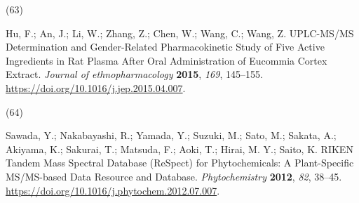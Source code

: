 \documentclass[
]{article}
\newlength{\cslhangindent}
\newlength{\csllabelwidth}
\newlength{\cslentryspacingunit} %
\newenvironment{CSLReferences}[2] %
 {%
  \setlength{\parindent}{0pt}
  \ifodd #1
  \let\oldpar\par
  \def\par{\hangindent=\cslhangindent\oldpar}
  \fi
  \setlength{\parskip}{#2\cslentryspacingunit}
 }%
 {}
\newcommand{\CSLLeftMargin}[1]{\parbox[t]{\csllabelwidth}{#1}}
\newcommand{\CSLRightInline}[1]{\parbox[t]{\linewidth - \csllabelwidth}{#1}\break}
\begin{document}
\begin{CSLReferences}{0}{0}
\leavevmode{}%
\CSLLeftMargin{(63) }%
\CSLRightInline{Hu, F.; An, J.; Li, W.; Zhang, Z.; Chen, W.; Wang, C.;
Wang, Z. {UPLC-MS}/{MS} Determination and Gender-Related Pharmacokinetic
Study of Five Active Ingredients in Rat Plasma After Oral Administration
of {Eucommia} Cortex Extract. \emph{Journal of ethnopharmacology}
\textbf{2015}, \emph{169}, 145--155.
\url{https://doi.org/10.1016/j.jep.2015.04.007}.}

\leavevmode{}%
\CSLLeftMargin{(64) }%
\CSLRightInline{Sawada, Y.; Nakabayashi, R.; Yamada, Y.; Suzuki, M.;
Sato, M.; Sakata, A.; Akiyama, K.; Sakurai, T.; Matsuda, F.; Aoki, T.;
Hirai, M. Y.; Saito, K. {RIKEN} Tandem Mass Spectral Database
({ReSpect}) for Phytochemicals: {A} Plant-Specific {MS}/{MS-based} Data
Resource and Database. \emph{Phytochemistry} \textbf{2012}, \emph{82},
38--45. \url{https://doi.org/10.1016/j.phytochem.2012.07.007}.}

\end{CSLReferences}
\end{document}
